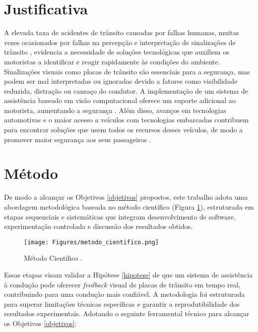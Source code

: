 \documentclass[
	12pt,				%
	oneside, %
	a4paper,			%
	english,			%
	french,				%
	spanish,			%
	brazil				%
	]{abntex2}
\begin{document}
\section{Justificativa}

A elevada taxa de acidentes de trânsito causadas por falhas humanas, muitas vezes ocasionados por falhas na percepção e interpretação de sinalizações de trânsito \cite{nhtsa_crash_causation}, evidencia a necessidade de soluções tecnológicas que auxiliem os motoristas a identificar e reagir rapidamente às condições do ambiente.
Sinalizações visuais como placas de trânsito são essenciais para a segurança, mas podem ser mal interpretadas ou ignoradas devido a fatores como visibilidade reduzida, distração ou cansaço do condutor.
A implementação de um sistema de assistência baseado em visão computacional oferece um suporte adicional ao motorista, aumentando a segurança \cite{okpono2024advanced}. Além disso, avanços em tecnologias automotivas e o maior acesso a veículos com tecnologias embarcadas contribuem para encontrar soluções que usem todos os recursos desses veículos, de modo a promover maior segurança aos seus passageiros \cite{castro2009human}.%


\section{Método} \label{metodo}

De modo a alcançar os Objetivos \ref{objetivos} propostos, este trabalho adota uma abordagem metodológica baseada no método científico (Figura \ref{metodo_cientifico}), estruturada em etapas sequenciais e sistemáticas que integram desenvolvimento de software, experimentação controlada e discussão dos resultados obtidos.

\begin{figure}[H]
\centering
\texttt{[image: Figures/metodo\_cientifico.png]}
\caption{Método Científico \cite[p. ~4]{wazlawick_metodologia_pesquisa}.}
\label{metodo_cientifico}
\end{figure}

Essas etapas visam validar a Hipótese \ref{hipotese} de que um sistema de assistência à condução pode oferecer \textit{feedback} visual de placas de trânsito em tempo real, contribuindo para uma condução mais confiável. A metodologia foi estruturada para superar limitações técnicas específicas e garantir a reprodutibilidade dos resultados experimentais. Adotando o seguinte ferramental técnico para alcançar os Objetivos \ref{objetivos}:
\end{document}
